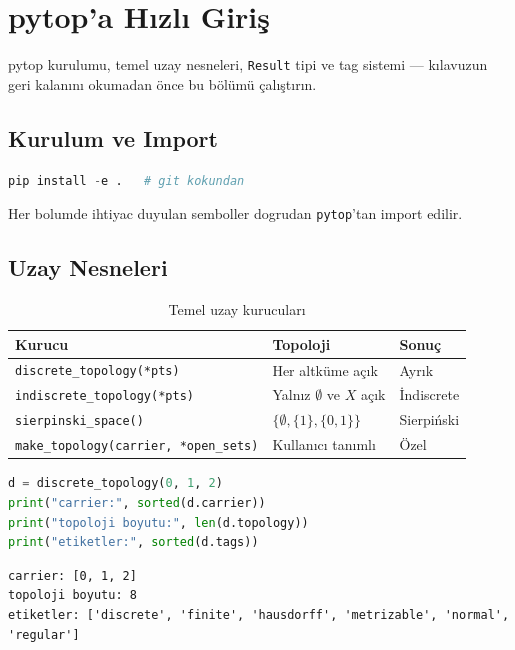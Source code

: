 \chapter{pytop'a Hızlı Giriş}

pytop kurulumu, temel uzay nesneleri, \texttt{Result} tipi ve tag sistemi —
kılavuzun geri kalanını okumadan önce bu bölümü çalıştırın.

\section{Kurulum ve Import}

\begin{lstlisting}[language=Python]
pip install -e .   # git kokundan
\end{lstlisting}

Her bolumde ihtiyac duyulan semboller dogrudan \texttt{pytop}'tan import edilir.

\section{Uzay Nesneleri}

\begin{table}[h]
\centering
\begin{tabular}{lll}
\toprule
\textbf{Kurucu} & \textbf{Topoloji} & \textbf{Sonuç} \\
\midrule
\texttt{discrete\_topology(*pts)} & Her altküme açık & Ayrık \\
\texttt{indiscrete\_topology(*pts)} & Yalnız $\emptyset$ ve $X$ açık & İndiscrete \\
\texttt{sierpinski\_space()} & $\{\emptyset, \{1\}, \{0,1\}\}$ & Sierpiński \\
\texttt{make\_topology(carrier, *open\_sets)} & Kullanıcı tanımlı & Özel \\
\bottomrule
\end{tabular}
\caption{Temel uzay kurucuları}
\end{table}

\begin{lstlisting}[language=Python]
d = discrete_topology(0, 1, 2)
print("carrier:", sorted(d.carrier))
print("topoloji boyutu:", len(d.topology))
print("etiketler:", sorted(d.tags))
\end{lstlisting}

\begin{verbatim}
carrier: [0, 1, 2]
topoloji boyutu: 8
etiketler: ['discrete', 'finite', 'hausdorff', 'metrizable', 'normal', 'regular']
\end{verbatim}


